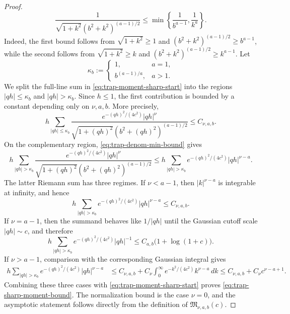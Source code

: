 \documentclass[10pt,reqno]{article}
\numberwithin{equation}{section}
\theoremstyle{plain}
\theoremstyle{definition}
\begin{document}
\begin{proof}
\begin{equation}
\frac{1}{\sqrt{1+k^2}(b^2+k^2)^{(a-1)/2}}\le \min\left\{\frac{1}{b^{a-1}},\frac{1}{k^a}\right\}.
\end{equation}
Indeed, the first bound follows from \(\sqrt{1+k^2}\ge1\) and \((b^2+k^2)^{(a-1)/2}\ge b^{a-1}\), while the second follows from \(\sqrt{1+k^2}\ge k\) and \((b^2+k^2)^{(a-1)/2}\ge k^{a-1}\). Let
\begin{equation}\label{eq:trap-kappa-b-def}
\kappa_b := \begin{cases} 1, & a=1,\\ b^{(a-1)/a}, & a>1. \end{cases}
\end{equation}
We split the full-line sum in \cref{eq:trap-moment-sharp-start} into the regions \(|qh|\le \kappa_b\) and \(|qh|>\kappa_b\). Since \(h\le1\), the first contribution is bounded by a constant depending only on \(\nu,a,b\). More precisely,
\begin{equation}
h\sum_{|qh|\le\kappa_b}\frac{e^{-(qh)^2/(4c^2)}|qh|^\nu}{\sqrt{1+(qh)^2}(b^2+(qh)^2)^{(a-1)/2}}\le C_{\nu,a,b}.
\end{equation}
On the complementary region, \cref{eq:trap-denom-min-bound} gives
\begin{equation}
h\sum_{|qh|>\kappa_b}\frac{e^{-(qh)^2/(4c^2)}|qh|^\nu}{\sqrt{1+(qh)^2}(b^2+(qh)^2)^{(a-1)/2}}\le h\sum_{|qh|>\kappa_b}e^{-(qh)^2/(4c^2)}|qh|^{\nu-a}.
\end{equation}
The latter Riemann sum has three regimes. If \(\nu<a-1\), then \(|k|^{\nu-a}\) is integrable at infinity, and hence
\begin{equation}
h\sum_{|qh|>\kappa_b}e^{-(qh)^2/(4c^2)}|qh|^{\nu-a}\le C_{\nu,a,b}.
\end{equation}
If \(\nu=a-1\), then the summand behaves like \(1/|qh|\) until the Gaussian cutoff scale \(|qh|\sim c\), and therefore
\begin{equation}
h\sum_{|qh|>\kappa_b}e^{-(qh)^2/(4c^2)}|qh|^{-1}\le C_{a,b}\bigl(1+\log(1+c)\bigr).
\end{equation}
If \(\nu>a-1\), comparison with the corresponding Gaussian integral gives
\begin{align}
h\sum_{|qh|>\kappa_b}e^{-(qh)^2/(4c^2)}|qh|^{\nu-a} &\le C_{\nu,a,b}+C_\nu\int_0^\infty e^{-k^2/(4c^2)}k^{\nu-a}\,dk \le C_{\nu,a,b}+C_\nu c^{\nu-a+1}.
\end{align}
Combining these three cases with \cref{eq:trap-moment-sharp-start} proves \cref{eq:trap-sharp-moment-bound}. The normalization bound is the case \(\nu=0\), and the asymptotic statement follows directly from the definition of \(\mathfrak M_{\nu,a,b}(c)\).
\end{proof}
\end{document}
